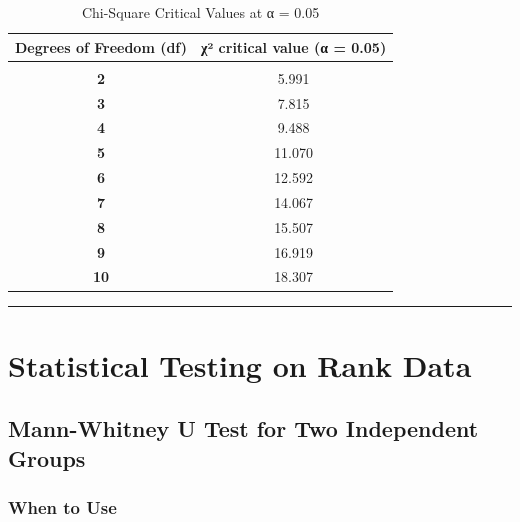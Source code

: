 \documentclass[
  12pt,
  letterpaper,
]{book}
\begin{document}
\begin{longtable}[t]{>{}cc}

\caption{\label{tbl-chisq}Chi-Square Critical Values at α = 0.05}

\tabularnewline

\toprule
Degrees of Freedom (df) & χ² critical value (α = 0.05)\\
\midrule
\cellcolor[HTML]{eaf4fb}{\textcolor[HTML]{2c7bb6}{\textbf{1}}} & \cellcolor[HTML]{eaf4fb}{3.841}\\
\textcolor[HTML]{2c7bb6}{\textbf{2}} & 5.991\\
\textcolor[HTML]{2c7bb6}{\textbf{3}} & 7.815\\
\textcolor[HTML]{2c7bb6}{\textbf{4}} & 9.488\\
\textcolor[HTML]{2c7bb6}{\textbf{5}} & 11.070\\
\addlinespace
\textcolor[HTML]{2c7bb6}{\textbf{6}} & 12.592\\
\textcolor[HTML]{2c7bb6}{\textbf{7}} & 14.067\\
\textcolor[HTML]{2c7bb6}{\textbf{8}} & 15.507\\
\textcolor[HTML]{2c7bb6}{\textbf{9}} & 16.919\\
\textcolor[HTML]{2c7bb6}{\textbf{10}} & 18.307\\
\bottomrule

\end{longtable}

\endgroup{}

\begin{center}\rule{0.5\linewidth}{0.5pt}\end{center}


\chapter{Statistical Testing on Rank
Data}\label{statistical-testing-on-rank-data}

\section{Mann-Whitney U Test for Two Independent
Groups}\label{mann-whitney-u-test-for-two-independent-groups}

\subsection{When to Use}\label{when-to-use-1}
\end{document}
